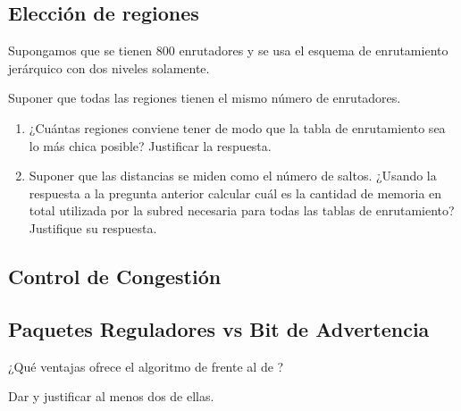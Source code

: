 \documentclass[12pt]{report}
\begin{document}
\begin{exer}
\subsection{Elección de regiones \stwo \shard}
Supongamos que se tienen 800 enrutadores y se usa el esquema de enrutamiento jerárquico con dos niveles solamente.

Suponer que todas las regiones tienen el mismo número de enrutadores.

\begin{enumerate}
\item ¿Cuántas regiones conviene tener de modo que la tabla de enrutamiento sea lo más chica posible? Justificar la respuesta.
\subitem {}
\subitem {}
\subitem {}
\item Suponer que las distancias se miden como el número de saltos. ¿Usando la
respuesta a la pregunta anterior calcular cuál es la cantidad de memoria en total
utilizada por la subred necesaria para todas las tablas de enrutamiento?
Justifique su respuesta.
\end{enumerate}
\end{exer}

\begin{exer}
\section{Control de Congestión}
\subsection{Paquetes Reguladores vs Bit de Advertencia \stwo \steo}
¿Qué ventajas ofrece el algoritmo de  frente al de ?

Dar y justificar al menos dos de ellas.
\end{exer}
\end{document}
